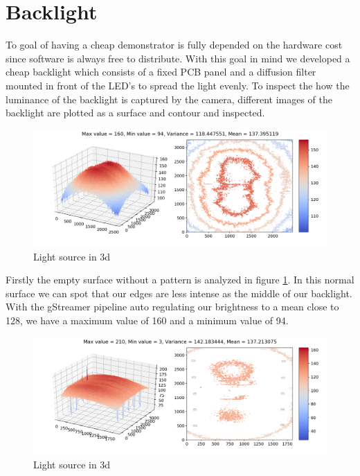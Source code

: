 \newpage
\section{Backlight}
To goal of having a cheap demonstrator is fully depended on the hardware cost since software is always free to distribute. With this goal in mind we developed a cheap backlight which consists of a fixed PCB panel and a diffusion filter mounted in front of the LED's to spread the light evenly. To inspect the how the luminance of the backlight is captured by the camera, different images of the backlight are plotted as a surface and contour and inspected.\\

\begin{figure}[ht]
	\centering
	\includegraphics[trim=50 0 0 0,clip,width=1\linewidth]{3-development/backlight/3d0.png}
	\caption{Light source in 3d\label{development:3d0}}
\end{figure} 
Firstly the empty surface without a pattern is analyzed in figure \ref{development:3d0}. In this normal surface we can spot that our edges are less intense as the middle of our backlight. With the gStreamer pipeline auto regulating our brightness to a mean close to 128, we have a maximum value of 160 and a minimum value of 94. 
\begin{figure}[ht]
	\centering
	\includegraphics[trim=50 0 0 0,clip,width=1\linewidth]{3-development/backlight/3d1.png}
	\caption{Light source in 3d\label{development:3d1}}
\end{figure} 

